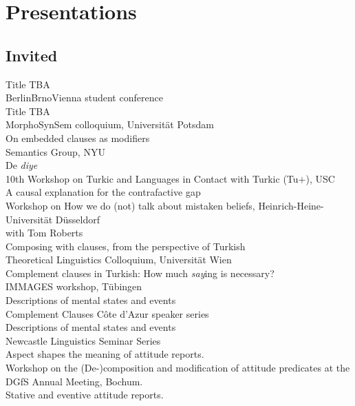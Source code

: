 \documentclass[11pt, a4paper]{article} %
\newcommand{\years}[1]{\marginnote{\scriptsize #1}} %
\begin{document}

\section*{Presentations}
\subsection*{Invited}
\years{2025} Title TBA \\
BerlinBrnoVienna student conference \\[.25em] %
Title TBA \\
MorphoSynSem colloquium, Universit\"at Potsdam \\[.25em] %
On embedded clauses as modifiers \\
Semantics Group, NYU \\[.25em]
De \emph{diye} \\
10th Workshop on Turkic and Languages in Contact with Turkic
(Tu$+$), USC \\[.25em]
A causal explanation for the contrafactive gap \\
Workshop on How we do (not) talk about mistaken beliefs,
Heinrich-Heine-Universit\"at D\"usseldorf \\
with Tom Roberts \\[.25em]
\years{2024} Composing with clauses, from the perspective of Turkish \\ 
Theoretical Linguistics Colloquium, Universit\"at Wien \\[.25em]
Complement clauses in Turkish: How much \emph{say}ing is necessary? \\
IMMAGES workshop, T\"ubingen \\[.25em]
Descriptions of mental states and events \\
Complement Clauses C\^ote d'Azur speaker series \\[.25em]
Descriptions of mental states and events \\
Newcastle Linguistics Seminar Series \\[.25em]
Aspect shapes the meaning of attitude reports. \\
Workshop on the (De-)composition and modification of attitude predicates at the
DGfS Annual Meeting, Bochum. \\[.25em] 
\years{2023} Stative and eventive attitude reports. \\
\end{document}
